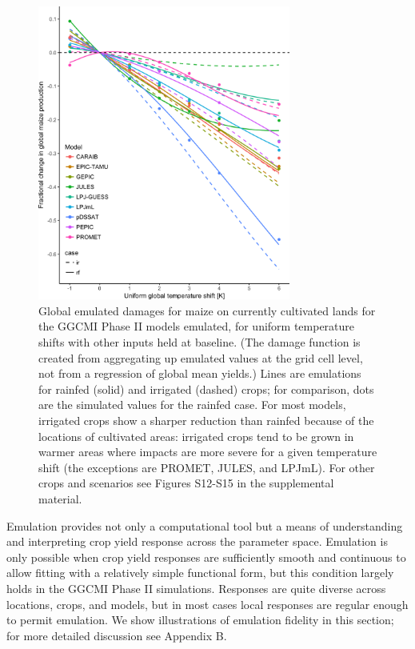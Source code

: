 \documentclass[esd, manuscript]{copernicus} %
\begin{document}
\begin{figure}[ht]
    \centering
    \includegraphics[width=8.3cm]{figures/global_em_maize.png}
    \caption{Global emulated damages for maize on currently cultivated lands for the GGCMI Phase II models emulated, for uniform temperature shifts with other inputs held at baseline. (The damage function is created from aggregating up emulated values at the grid cell level, not from a regression of global mean yields.) Lines are emulations for rainfed (solid) and irrigated (dashed) crops; for comparison, dots are the simulated values for the rainfed case.  For most models, irrigated crops show a sharper reduction than rainfed because of the locations of cultivated areas: irrigated crops tend to be grown in warmer areas where impacts are more severe for a given temperature shift (the exceptions are PROMET, JULES, and LPJmL). For other crops and scenarios see Figures S12-S15 in the supplemental material.}
    \label{fig:globe_em}
\end{figure}

Emulation provides not only a computational tool but a means of understanding and interpreting crop yield response across the parameter space. Emulation is only possible  when crop yield responses are sufficiently smooth and continuous to allow fitting with a relatively simple functional form, but this condition largely holds in the GGCMI Phase II simulations. Responses are quite diverse across locations, crops, and models, but in most cases local responses are regular enough to permit emulation. We show illustrations of emulation fidelity in this section; for more detailed discussion see Appendix B.
\end{document}
